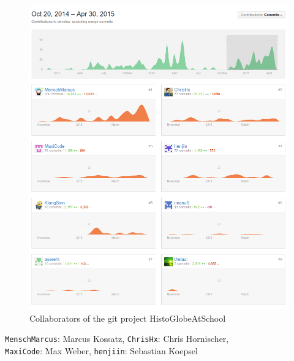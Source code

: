 \begin{figure}[H]
  \begin{center}
    \includegraphics[width=1\textwidth]{graphics/git.png}
  \end{center}
  \caption{Collaborators of the git project HistoGlobeAtSchool}
  \label{fig:git}
\end{figure}

\begin{center}
\begin{small}
  \texttt{MenschMarcus}: Marcus Kossatz, \texttt{ChrisHx}: Chris Hornischer, \\
  \texttt{MaxiCode}: Max Weber, \texttt{henjiin}: Sebastian Koepsel
\end{small}
\end{center}

